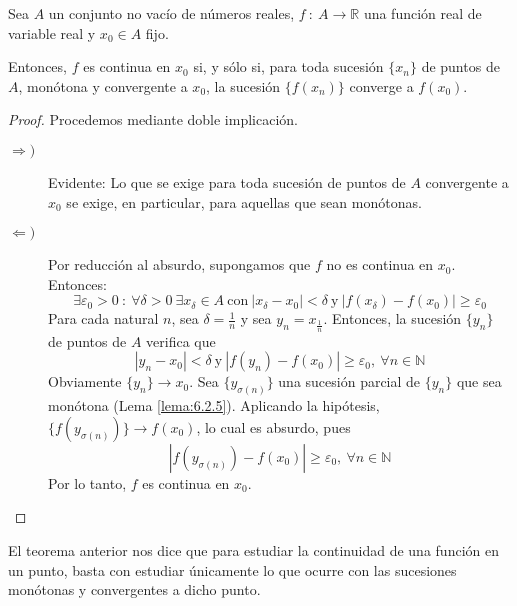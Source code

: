 \begin{teo}\label{teo:12.4.2}
    Sea $A$ un conjunto no vacío de números reales, $f ~:~ A \longrightarrow \mathbb{R}$ una función real de variable real y $x_0 \in A$ fijo.
    
    Entonces, $f$ es continua en $x_0$ si, y sólo si, para toda sucesión $\{x_n\}$ de puntos de $A$, monótona y convergente a $x_0$, la sucesión $\{f(x_n)\}$ converge a $f(x_0)$.
\end{teo}\begin{proof} Procedemos mediante doble implicación.
\begin{description}
    \item[$\Longrightarrow)$]
        Evidente: Lo que se exige para toda sucesión de puntos de $A$ convergente a $x_0$ se exige, en particular, para aquellas que sean monótonas.
    \item[$\Longleftarrow)$]
        Por reducción al absurdo, supongamos que $f$ no es continua en $x_0$. Entonces:
        \begin{equation*}
            \exists \varepsilon_0 > 0 ~:~ \forall \delta > 0 ~ \exists x_{\delta} \in A ~ \text{con} ~ |x_{\delta}-x_0| < \delta ~ \text{y} ~ |f(x_{\delta})-f(x_0)| \geq \varepsilon_0
        \end{equation*}
        Para cada natural $n$, sea $\delta = \frac{1}{n}$ y sea $y_n=x_{\frac{1}{n}}$. Entonces, la sucesión $\{y_n\}$ de puntos de $A$ verifica que
        \begin{equation*}
            |y_n-x_0| < \delta ~ \text{y} ~ |f(y_n)-f(x_0)| \geq \varepsilon_0, ~ \forall n \in \mathbb{N}
        \end{equation*}
        Obviamente $\{y_n\} \longrightarrow x_0$. Sea $\{y_{\sigma(n)}\}$ una sucesión parcial de $\{y_n\}$ que sea monótona (Lema \ref{lema:6.2.5}).
        Aplicando la hipótesis, $\{f(y_{\sigma(n)})\} \longrightarrow f(x_0)$, lo cual es absurdo, pues
        \begin{equation*}
            |f(y_{\sigma(n)})-f(x_0)| \geq \varepsilon_0, ~ \forall n \in \mathbb{N}
        \end{equation*}
        Por lo tanto, $f$ es continua en $x_0$.
\end{description}
    
\end{proof}

El teorema anterior nos dice que para estudiar la continuidad de una función en un punto, basta con estudiar únicamente lo que ocurre con las sucesiones monótonas y convergentes a dicho punto.

